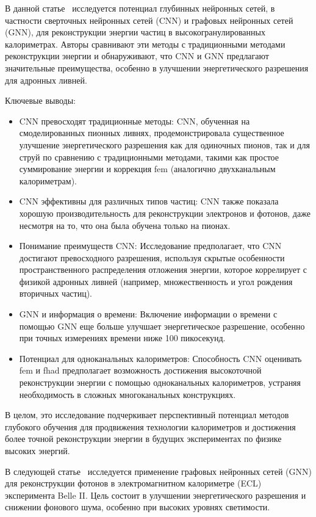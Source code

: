 \documentclass[a4paper,12pt]{extarticle}
\begin{document}
В данной статье~\cite{Akchurin_2021} исследуется потенциал глубинных нейронных сетей, в частности сверточных нейронных сетей (CNN) и графовых нейронных сетей (GNN), для реконструкции энергии частиц в высокогранулированных калориметрах. Авторы сравнивают эти методы с традиционными методами реконструкции энергии и обнаруживают, что CNN и GNN предлагают значительные преимущества, особенно в улучшении энергетического разрешения для адронных ливней.

Ключевые выводы:

\begin{itemize}
    \item CNN превосходят традиционные методы: CNN, обученная на смоделированных пионных ливнях, продемонстрировала существенное улучшение энергетического разрешения как для одиночных пионов, так и для струй по сравнению с традиционными методами, такими как простое суммирование энергии и коррекция fem (аналогично двухканальным калориметрам).
    \item CNN эффективны для различных типов частиц: CNN также показала хорошую производительность для реконструкции электронов и фотонов, даже несмотря на то, что она была обучена только на пионах.
    \item Понимание преимуществ CNN: Исследование предполагает, что CNN достигают превосходного разрешения, используя скрытые особенности пространственного распределения отложения энергии, которое коррелирует с физикой адронных ливней (например, множественность и угол рождения вторичных частиц).
    \item GNN и информация о времени: Включение информации о времени с помощью GNN еще больше улучшает энергетическое разрешение, особенно при точных измерениях времени ниже 100 пикосекунд.
    \item Потенциал для одноканальных калориметров: Способность CNN оценивать fem и fhad предполагает возможность достижения высокоточной реконструкции энергии с помощью одноканальных калориметров, устраняя необходимость в сложных многоканальных конструкциях.
\end{itemize}

В целом, это исследование подчеркивает перспективный потенциал методов глубокого обучения для продвижения технологии калориметров и достижения более точной реконструкции энергии в будущих экспериментах по физике высоких энергий.

В следующей статье~\cite{Wemmer_2023} исследуется применение графовых нейронных сетей (GNN) для реконструкции фотонов в электромагнитном калориметре (ECL) эксперимента Belle II. Цель состоит в улучшении энергетического разрешения и снижении фонового шума, особенно при высоких уровнях светимости.
\end{document}
